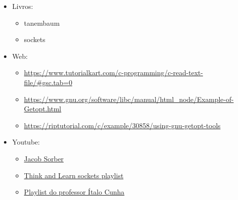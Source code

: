 \documentclass{article}
\begin{document}
\begin{itemize}
    \item Livros:
          \begin{itemize}
              \item tanembaum
              \item sockets
          \end{itemize}

    \item Web:
          \begin{itemize}
              \item
                    \url{https://www.tutorialkart.com/c-programming/c-read-text-file/#gsc.tab=0}
              \item
                    \url{https://www.gnu.org/software/libc/manual/html_node/Example-of-Getopt.html}
              \item
                    \url{https://riptutorial.com/c/example/30858/using-gnu-getopt-tools}
          \end{itemize}

    \item Youtube:
          \begin{itemize}
              \item \href{https://www.youtube.com/@JacobSorber}{Jacob Sorber}
              \item \href{https://www.youtube.com/watch?v=_lQ-3S4fJ0U&list=PLPyaR5G9aNDvs6TtdpLcVO43_jvxp4emI}{Think and Learn sockets playlist}
              \item \href{https://www.youtube.com/watch?v=tJ3qNtv0HVs&t=2s}{Playlist do professor Ítalo Cunha}
            \end{itemize}

\end{itemize}
\end{document}
